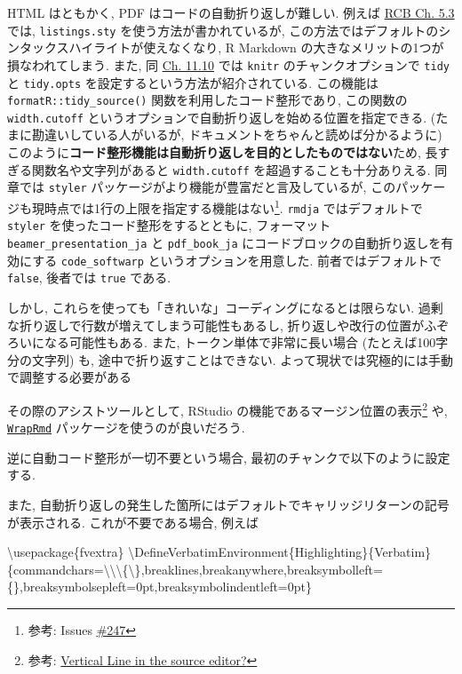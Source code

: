 \documentclass[
  xelatex,ja=standard,jafont=noto]{bxjsbook}
\newenvironment{Shaded}{\begin{snugshade}}{\end{snugshade}}
\newcommand{\BuiltInTok}[1]{#1}
\newcommand{\ExtensionTok}[1]{#1}
\newcommand{\FunctionTok}[1]{\textcolor[rgb]{0.00,0.00,0.00}{#1}}
\newcommand{\NormalTok}[1]{#1}
\theoremstyle{definition}
\theoremstyle{definition}
\theoremstyle{definition}
\theoremstyle{definition}
\theoremstyle{remark}
\begin{document}
HTML はともかく, PDF はコードの自動折り返しが難しい. 例えば
\href{https://gedevan-aleksizde.github.io/rmarkdown-cookbook/text-width.html}{RCB
Ch. 5.3} では, \texttt{listings.sty} を使う方法が書かれているが,
この方法ではデフォルトのシンタックスハイライトが使えなくなり, R Markdown
の大きなメリットの1つが損なわれてしまう. また, 同
\href{https://gedevan-aleksizde.github.io/rmarkdown-cookbook/opts-tidy.html}{Ch.
11.10} では \texttt{knitr} のチャンクオプションで \texttt{tidy} と
\texttt{tidy.opts} を設定するという方法が紹介されている. この機能は
\texttt{formatR::tidy\_source()} 関数を利用したコード整形であり,
この関数の \texttt{width.cutoff}
というオプションで自動折り返しを始める位置を指定できる.
(たまに勘違いしている人がいるが,
ドキュメントをちゃんと読めば分かるように)
このように\textbf{コード整形機能は自動折り返しを目的としたものではない}ため,
長すぎる関数名や文字列があると \texttt{width.cutoff}
を超過することも十分ありえる. 同章では \texttt{styler}
パッケージがより機能が豊富だと言及しているが,
このパッケージも現時点では1行の上限を指定する機能はない\footnote{参考:
  Issues \href{https://github.com/r-lib/styler/issues/247}{\#247}}.
\texttt{rmdja} ではデフォルトで \texttt{styler}
を使ったコード整形をするとともに, フォーマット
\texttt{beamer\_presentation\_ja} と \texttt{pdf\_book\_ja}
にコードブロックの自動折り返しを有効にする \texttt{code\_softwarp}
というオプションを用意した. 前者ではデフォルトで \texttt{false},
後者では \texttt{true} である.

しかし, これらを使っても「きれいな」コーディングになるとは限らない.
過剰な折り返しで行数が増えてしまう可能性もあるし,
折り返しや改行の位置がふぞろいになる可能性もある. また,
トークン単体で非常に長い場合 (たとえば100字分の文字列) も,
途中で折り返すことはできない.
よって現状では究極的には手動で調整する必要がある

その際のアシストツールとして, RStudio
の機能であるマージン位置の表示\footnote{参考:
  \href{https://community.rstudio.com/t/vertical-line-in-the-source-editor/24950}{Vertical
  Line in the source editor?}} や,
\href{https://github.com/tjmahr/WrapRmd}{\texttt{WrapRmd}}
パッケージを使うのが良いだろう.

逆に自動コード整形が一切不要という場合,
最初のチャンクで以下のように設定する.

また,
自動折り返しの発生した箇所にはデフォルトでキャリッジリターンの記号が表示される.
これが不要である場合, 例えば

\begin{Shaded}
\begin{Highlighting}[]
\BuiltInTok{\textbackslash{}usepackage}\NormalTok{\{}\ExtensionTok{fvextra}\NormalTok{\}}
\FunctionTok{\textbackslash{}DefineVerbatimEnvironment}\NormalTok{\{Highlighting\}\{Verbatim\}\{commandchars=}\FunctionTok{\textbackslash{}\textbackslash{}\textbackslash{}\{\textbackslash{}\}}\NormalTok{,breaklines,breakanywhere,breaksymbolleft=\{\},breaksymbolsepleft=0pt,breaksymbolindentleft=0pt\}}
\end{Highlighting}
\end{Shaded}
\end{document}
